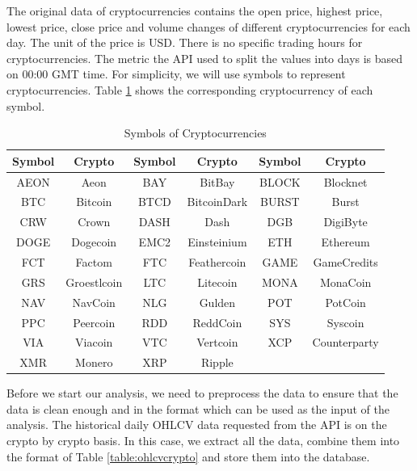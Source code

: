 \documentclass[11pt]{article} %
\theoremstyle{plain}
\theoremstyle{definition}
\begin{document}
The original data of cryptocurrencies contains the open price, highest price, lowest price, close price and volume changes of different cryptocurrencies for each day. The unit of the price is USD. There is no specific trading hours for cryptocurrencies. The metric the API used to split the values into days is based on 00:00 GMT time. For simplicity, we will use symbols to represent cryptocurrencies. Table \ref{table:symbolcrypto} shows the corresponding cryptocurrency of each symbol.

{
  \begin{table}[ht]
    \centering
    \small
    \begin{tabular}{|c|c|c|c|c|c|}
        \hline
        Symbol & Crypto & Symbol & Crypto & Symbol & Crypto \\
        \hline
        AEON & Aeon & BAY & BitBay & BLOCK & Blocknet \\
        BTC & Bitcoin & BTCD & BitcoinDark & BURST & Burst \\
        CRW & Crown & DASH & Dash & DGB & DigiByte \\
        DOGE & Dogecoin & EMC2 & Einsteinium & ETH & Ethereum \\
        FCT & Factom & FTC & Feathercoin & GAME & GameCredits \\
        GRS & Groestlcoin & LTC & Litecoin & MONA & MonaCoin \\
        NAV & NavCoin & NLG & Gulden & POT & PotCoin \\
        PPC & Peercoin & RDD & ReddCoin & SYS & Syscoin \\
        VIA & Viacoin & VTC & Vertcoin & XCP & Counterparty \\
        XMR & Monero & XRP & Ripple & & \\
        \hline
    \end{tabular}
    \caption{Symbols of Cryptocurrencies}
    \label{table:symbolcrypto}
  \end{table}
}

Before we start our analysis, we need to preprocess the data to ensure that the data is clean enough and in the format which can be used as the input of the analysis. The historical daily OHLCV data requested from the API is on the crypto by crypto basis. In this case, we extract all the data, combine them into the format of Table \ref{table:ohlcvcrypto} and store them into the database.
\end{document}
